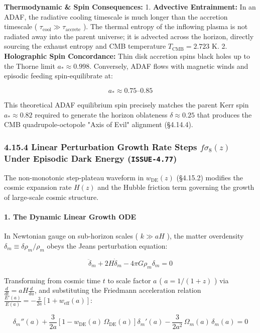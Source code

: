 \documentclass[11pt,a4paper]{article}
\theoremstyle{definition}\newtheorem{definition}{Definition}
\theoremstyle{remark}\newtheorem{remark}{Remark}
\begin{document}
\textbf{Thermodynamic \& Spin Consequences:}
1. \textbf{Advective Entrainment:} In an ADAF, the radiative cooling timescale is much longer than the accretion timescale ( $\tau_{\text{cool}} \gg \tau_{\text{accrete}}$ ). The thermal entropy of the inflowing plasma is not radiated away into the parent universe; it is advected across the horizon, directly sourcing the exhaust entropy and CMB temperature $T_{\text{CMB}} = 2.723\text{ K}$.
2. \textbf{Holographic Spin Concordance:} Thin disk accretion spins black holes up to the Thorne limit $a_* \approx 0.998$. Conversely, ADAF flows with magnetic winds and episodic feeding spin-equilibrate at:


\begin{equation}
a_* \approx 0.75\text{--}0.85
\end{equation}


This theoretical ADAF equilibrium spin precisely matches the parent Kerr spin $a_* \approx 0.82$ required to generate the horizon oblateness $\delta \approx 0.25$ that produces the CMB quadrupole-octopole "Axis of Evil" alignment (§4.14.4).
\subsubsection{4.15.4 Linear Perturbation Growth Rate Steps $f\sigma_8(z)$ Under Episodic Dark Energy (\texttt{ISSUE-4.77})}

The non-monotonic step-plateau waveform in $w_{\text{DE}}(z)$ (§4.15.2) modifies the cosmic expansion rate $H(z)$ and the Hubble friction term governing the growth of large-scale cosmic structure.
\paragraph{1. The Dynamic Linear Growth ODE}

In Newtonian gauge on sub-horizon scales ( $k \gg aH$ ), the matter overdensity $\delta_m \equiv \delta\rho_m / \rho_m$ obeys the Jeans perturbation equation:


\begin{equation}
\ddot{\delta}_m + 2H\dot{\delta}_m - 4\pi G \rho_m \delta_m = 0
\end{equation}


Transforming from cosmic time $t$ to scale factor $a$ ( $a = 1/(1+z)$ ) via $\frac{d}{dt} = aH\frac{d}{da}$, and substituting the Friedmann acceleration relation $\frac{E'(a)}{E(a)} = -\frac{3}{2a}[1 + w_{\text{eff}}(a)]$:


\begin{equation}
\boxed{\delta_m''(a) + \frac{3}{2a}\left[ 1 - w_{\text{DE}}(a)\,\Omega_{\text{DE}}(a) \right] \delta_m'(a) - \frac{3}{2a^2}\,\Omega_m(a)\,\delta_m(a) = 0}
\end{equation}
\end{document}
